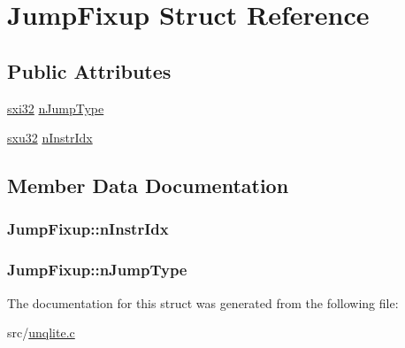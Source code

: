 \hypertarget{struct_jump_fixup}{\section{Jump\-Fixup Struct Reference}
\label{d2/d2d/struct_jump_fixup}
}
\subsection*{Public Attributes}
\begin{DoxyCompactItemize}
\item 
\hyperlink{unqlite_8c_a5a58035d4ae379178e2ca46cc3272fc5}{sxi32} \hyperlink{struct_jump_fixup_aadaf26485d7901be3127e08e6998a694}{n\-Jump\-Type}
\item 
\hyperlink{unqlite_8c_abc5a8a3f345c200c98c485551f49666e}{sxu32} \hyperlink{struct_jump_fixup_ad193f8254c55b47f42366350d6f5e3fa}{n\-Instr\-Idx}
\end{DoxyCompactItemize}


\subsection{Member Data Documentation}
\hypertarget{struct_jump_fixup_ad193f8254c55b47f42366350d6f5e3fa}{
\subsubsection[{n\-Instr\-Idx}]{ Jump\-Fixup\-::n\-Instr\-Idx}}\label{d2/d2d/struct_jump_fixup_ad193f8254c55b47f42366350d6f5e3fa}
\hypertarget{struct_jump_fixup_aadaf26485d7901be3127e08e6998a694}{
\subsubsection[{n\-Jump\-Type}]{ Jump\-Fixup\-::n\-Jump\-Type}}\label{d2/d2d/struct_jump_fixup_aadaf26485d7901be3127e08e6998a694}


The documentation for this struct was generated from the following file\-:\begin{DoxyCompactItemize}
\item 
src/\hyperlink{unqlite_8c}{unqlite.\-c}\end{DoxyCompactItemize}
